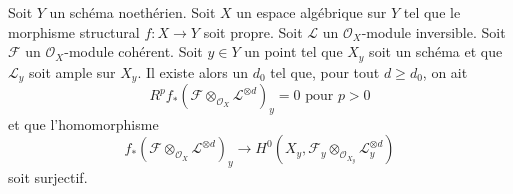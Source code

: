 \begin{lemma}
\label{lemma-ample-on-fibre}
Soit $Y$ un schéma noethérien. Soit $X$ un espace algébrique sur $Y$
tel que le morphisme structural $f : X \to Y$ soit propre.
Soit $\mathcal{L}$ un $\mathcal{O}_X$-module inversible.
Soit $\mathcal{F}$ un $\mathcal{O}_X$-module cohérent.
Soit $y \in Y$ un point tel que $X_y$ soit un schéma et que
$\mathcal{L}_y$ soit ample sur $X_y$.
Il existe alors un $d_0$ tel que, pour tout $d \geq d_0$, on ait
$$
R^pf_*(\mathcal{F} \otimes_{\mathcal{O}_X} \mathcal{L}^{\otimes d})_y = 0
\text{ pour }p > 0
$$
et que l'homomorphisme
$$
f_*(\mathcal{F} \otimes_{\mathcal{O}_X} \mathcal{L}^{\otimes d})_y
\longrightarrow
H^0(X_y, \mathcal{F}_y \otimes_{\mathcal{O}_{X_y}} \mathcal{L}_y^{\otimes d})
$$
soit surjectif.
\end{lemma}

